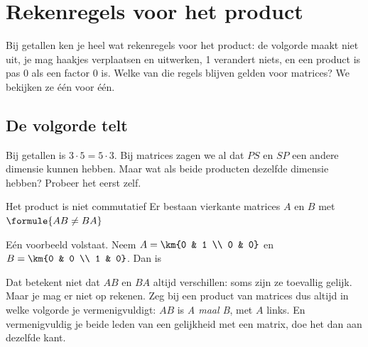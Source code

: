\begin{oefeningen}
\end{oefeningen}

\section{Rekenregels voor het product}

Bij getallen ken je heel wat rekenregels voor het product: de volgorde maakt niet uit, je mag haakjes verplaatsen en uitwerken, 1 verandert niets, en een product is pas 0 als een factor 0 is. Welke van die regels blijven gelden voor matrices? We bekijken ze één voor één.

\subsection{De volgorde telt}

Bij getallen is $3 \cdot 5 = 5 \cdot 3$. Bij matrices zagen we al dat $PS$ en $SP$ een andere dimensie kunnen hebben. Maar wat als beide producten dezelfde dimensie hebben? Probeer het eerst zelf.

\begin{oefeningen}
\end{oefeningen}

\begin{theorie}
\begin{stelling}{Het product is niet commutatief}
Er bestaan vierkante matrices $A$ en $B$ met \qquad $\formule{AB \neq BA}$
\end{stelling}

\begin{bewijs}
Eén voorbeeld volstaat. Neem $A = \km{0 & 1 \\ 0 & 0}$ en $B = \km{0 & 0 \\ 1 & 0}$. Dan is
\end{bewijs}
\end{theorie}

Dat betekent niet dat $AB$ en $BA$ altijd verschillen: soms zijn ze toevallig gelijk. Maar je mag er niet op rekenen. Zeg bij een product van matrices dus altijd in welke volgorde je vermenigvuldigt: $AB$ is \textit{A maal B}, met $A$ links. En vermenigvuldig je beide leden van een gelijkheid met een matrix, doe het dan aan dezelfde kant.

